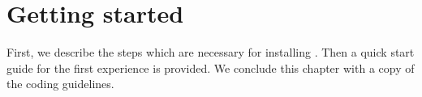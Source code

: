 \chapter{Getting started}

First, we describe the steps which are necessary for installing \Dumux. Then a quick start guide for the first \Dumux experience is provided. We conclude this chapter with a copy of the \Dune coding guidelines. 






